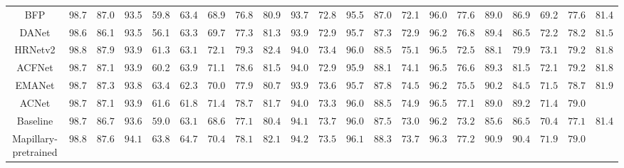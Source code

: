 \begin{table}[t]
\begin{center}
{\begin{tabular}{  c | c  c  c  c  c c  c  c c  c  c c  c  c c  c  c c  c | c }
				BFP \cite{Ding2019BAFP}  & 98.7  & 87.0 &  93.5 &  59.8  & 63.4  & 68.9  & 76.8  & 80.9  & 93.7 &  72.8 &  95.5  & 87.0  & 72.1  & 96.0  & 77.6  & 89.0  & 86.9  & 69.2  & 77.6 &  81.4 \\
				DANet  \cite{Fu2018DANet}        &  98.6   &   86.1   &   93.5  &    56.1  &    63.3  &    69.7   &   77.3  &    81.3  &    93.9   &   72.9  &    95.7  &    87.3   &   72.9   &   96.2   &   76.8   &   89.4   &   86.5   &   72.2  &    78.2 &     $81.5$        \\
				HRNetv2  \cite{Sun2019HRNet}        &  $98.8$     &     $87.9$   &  $93.9$     &     $61.3$ &  $63.1$     &     $72.1$ &  $79.3$     &     $82.4$ &  $94.0$     &     $73.4$ &  $96.0$     &     $88.5$ &  $75.1$     &     $96.5$ &  $72.5$     &     $88.1$ &  $79.9$     &     $73.1$ &  $79.2$     &     $81.8$        \\
				ACFNet \cite{Zhang2019ACFNet}   &  98.7  & 87.1  & 93.9  & 60.2  & 63.9  & 71.1  & 78.6  & 81.5  & 94.0  & 72.9  & 95.9  & 88.1  & 74.1 &  96.5  & 76.6  & 89.3  & 81.5  & 72.1  & 79.2 &  81.8 \\
				EMANet  \cite{Li2019EMANet}        &  $98.7$     &     $87.3$   &  $93.8$     &     $63.4$ &  $62.3$     &     $70.0$ &  $77.9$     &     $80.7$ &  $93.9$     &     $73.6$ &  $95.7$     &     $87.8$ &  $74.5$     &     $96.2$ &  $75.5$     &     $90.2$ &  $84.5$     &     $71.5$ &  $78.7$     &     $81.9$        \\
				ACNet \cite{Fu2019ACNet} &  98.7 & 87.1 &  93.9  & 61.6  & 61.8  & 71.4 &  78.7 &  81.7 &  94.0 &  73.3 &  96.0 &  88.5 &  74.9  & 96.5  & 77.1  & 89.0 &  89.2 &  71.4 &  79.0  &     \secbest{82.3}        \\
				\hline
				Baseline   &  $98.7$     &     $86.7$   &  $93.6$     &     $59.0$ &  $63.1$     &     $68.6$ &  $77.1$     &     $80.4$ &  $94.1$     &     $73.7$ &  $96.0$     &     $87.5$ &  $73.0$     &     $96.2$ &  $73.2$     &     $85.6$ &  $86.5$     &     $70.4$ &  $77.1$     &     81.4        \\
				Mapillary-pretrained   &  $98.8$     &     $87.6$   &  $94.1$     &     $63.8$ &  $64.7$     &     $70.4$ &  $78.1$     &     $82.1$ &  $94.2$     &     $73.5$ &  $96.1$     &     $88.3$ &  $73.7$     &     $96.3$ &  $77.2$     &     $90.9$ &  $90.4$     &     $71.9$ &  $79.0$     &     \best{82.7}        \\

\end{tabular}}
\end{center}
\end{table}
